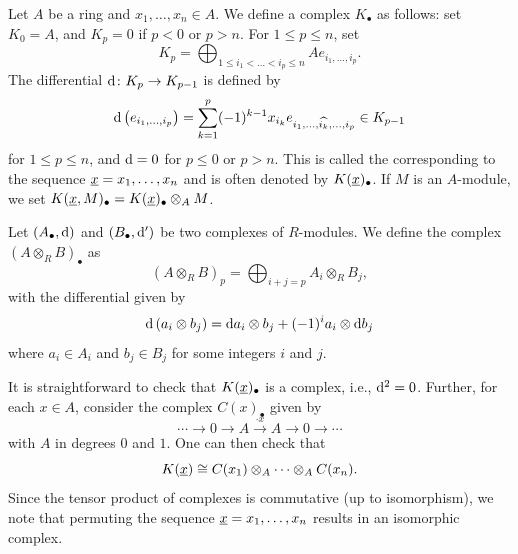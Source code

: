 \begin{definition}
    Let $A$ be a ring and $x_1,\dots,x_n\in A$. We define a complex $K_\bullet$ as follows: set $K_0 = A$, and $K_p = 0$ if $p < 0$ or $p > n$. For $1\le p\le n$, set 
    \begin{equation*}
        K_p = \bigoplus_{1\le i_1 < \dots < i_p\le n} Ae_{i_1,\dots,i_p}.
    \end{equation*}
    The differential $\mathrm{d}\colon K_p\to K_{p - 1}$ is defined by 
    \begin{equation*}
        \mathrm{d}\left(e_{i_1,\dots,i_p}\right) = \sum_{k = 1}^p (-1)^{k - 1} x_{i_k} e_{i_1,\dots,\widehat{i_k},\dots,i_p}\in K_{p - 1}
    \end{equation*}
    for $1\le p\le n$, and $\mathrm{d} = 0$ for $p\le 0$ or $p > n$. This is called the  corresponding to the sequence $\underline{x} = x_1,\dots,x_n$ and is often denoted by $K(\underline{x})_\bullet$. If $M$ is an $A$-module, we set $K(\underline{x}, M)_\bullet = K(\underline{x})_\bullet\otimes_A M$.
\end{definition}

\begin{interlude}
    Let $\left(A_\bullet, \mathrm{d}\right)$ and $\left(B_\bullet, \mathrm{d}'\right)$ be two complexes of $R$-modules. We define the complex $\left(A\otimes_R B\right)_\bullet$ as 
    \begin{equation*}
        \left(A\otimes_R B\right)_p = \bigoplus_{i + j = p} A_i\otimes_R B_j,
    \end{equation*}
    with the differential given by 
    \begin{equation*}
        \mathrm{d}\left(a_i\otimes b_j\right) = \mathrm{d} a_i\otimes b_j + (-1)^i a_i\otimes\mathrm{d} b_j
    \end{equation*}
    where $a_i\in A_i$ and $b_j\in B_j$ for some integers $i$ and $j$.
\end{interlude}

\begin{remark}
    It is straightforward to check that $K(\underline{x})_\bullet$ is a complex, i.e., $\mathrm{d}^2 = 0$. Further, for each $x\in A$, consider the complex $C(x)_\bullet$ given by 
    \begin{equation*}
        \cdots\to 0\to A\xrightarrow{\cdot x} A\to 0\to\cdots
    \end{equation*}
    with $A$ in degrees $0$ and $1$. One can then check that 
    \begin{equation*}
        K(\underline{x}) \cong C(x_1)\otimes_A \cdots\otimes_A C(x_n).
    \end{equation*}
    Since the tensor product of complexes is commutative (up to isomorphism), we note that permuting the sequence $\underline{x} = x_1,\dots,x_n$ results in an isomorphic complex.
\end{remark}

